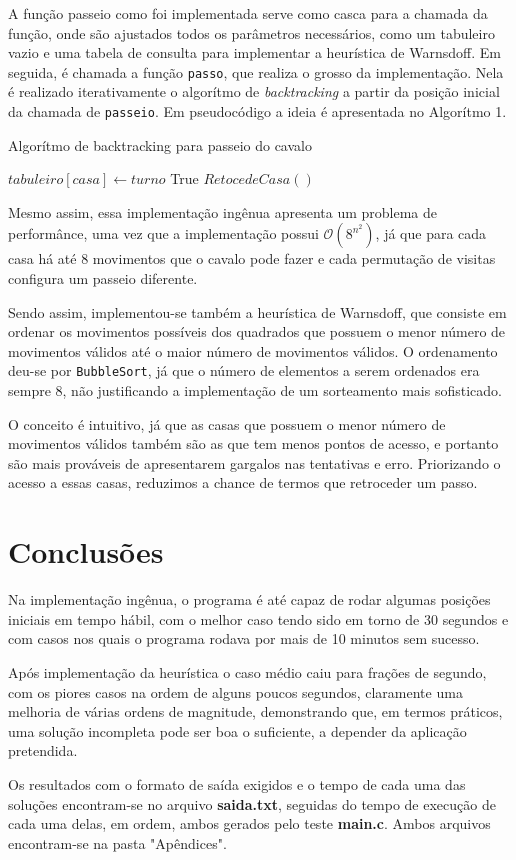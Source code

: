 \documentclass[
	twocolumn,
	12pt,				%
	twoside,			%
	a4paper,			%
	english,			%
	brazil				%
	]{article}
\begin{document}
A função passeio como foi implementada serve como casca para a chamada
da função, onde são ajustados todos os parâmetros necessários, como um
tabuleiro vazio e uma tabela de consulta para implementar a heurística
de Warnsdoff. Em seguida, é chamada a função \verb|passo|, que realiza o grosso
da implementação. Nela é realizado iterativamente o algorítmo de \textit{backtracking}
a partir da posição inicial da chamada de \verb|passeio|. Em pseudocódigo
a ideia é apresentada no Algorítmo 1.

\begin{algorithm}
	\caption{Algorítmo de backtracking para passeio do cavalo}
	\begin{algorithmic}[1]
				\State $tabuleiro[casa] \gets turno$
					\State \Return True
				\Else 
				\State $RetocedeCasa()$
				\EndIf	
			\EndFor
		\EndFunction
	\end{algorithmic}
\end{algorithm}

Mesmo assim, essa implementação ingênua apresenta um problema de performânce,
uma vez que a implementação possui $\mathcal{O}(8^{n^2})$, já que para cada 
casa há até 8 movimentos que o cavalo pode fazer e cada permutação de visitas
configura um passeio diferente.

Sendo assim, implementou-se também a heurística de Warnsdoff, que consiste
em ordenar os movimentos possíveis dos quadrados que possuem o menor número
de movimentos válidos até o maior número de movimentos válidos. O ordenamento 
deu-se por \verb|BubbleSort|, já que o número de elementos a serem ordenados
era sempre 8, não justificando a implementação de um sorteamento mais sofisticado. 

O conceito é intuitivo, já que as casas que possuem o menor número de movimentos válidos
também são as que tem menos pontos de acesso, e portanto são mais prováveis
de apresentarem gargalos nas tentativas e erro. Priorizando o acesso a essas
casas, reduzimos a chance de termos que retroceder um passo.

\section*{Conclusões}
Na implementação ingênua, o programa é até capaz de rodar algumas posições
iniciais em tempo hábil, com o melhor caso tendo sido em torno de 30 segundos 
e com casos nos quais o programa rodava por mais de 10 minutos sem sucesso.

Após implementação da heurística o caso médio caiu para frações de segundo, 
com os piores casos na ordem de alguns poucos segundos, claramente uma melhoria
de várias ordens de magnitude, demonstrando que, em termos práticos, uma solução
incompleta pode ser boa o suficiente, a depender da aplicação pretendida.

Os resultados com o formato de saída exigidos e o tempo de cada uma das 
soluções encontram-se no arquivo \textbf{saida.txt}, seguidas do tempo de execução de cada
uma delas, em ordem, ambos gerados pelo teste \textbf{main.c}. Ambos arquivos encontram-se na pasta "Apêndices".


\printbibliography
\end{document}
